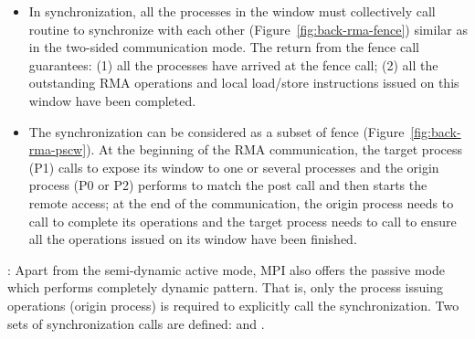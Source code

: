 \begin{itemize}
  \item In  synchronization, all the processes in the window
  must collectively call  routine to synchronize with
  each other (Figure~\ref{fig:back-rma-fence}) similar as  in the
  two-sided communication mode. The return from the fence call guarantees:
  (1) all the processes have arrived at the fence call; (2) all the outstanding
  RMA operations and local load\slash store instructions issued on this window
  have been completed.

  \item The  synchronization can be considered as
  a subset of fence (Figure~\ref{fig:back-rma-pscw}). At the beginning of
  the RMA communication, the target process (P1) calls 
  to expose its window to one or several processes and the origin process
  (P0 or P2) performs  to match the post call and then
  starts the remote access; at the end of the communication, the origin
  process needs to call  to complete its operations
  and the target process needs to call  to ensure all
  the operations issued on its window have been finished.
\end{itemize}

:
Apart from the semi-dynamic active mode, MPI also offers the passive mode
which performs completely dynamic pattern. That is, only the process
issuing operations (origin process) is required to explicitly call the
synchronization. Two sets of synchronization calls are defined:
 and .

